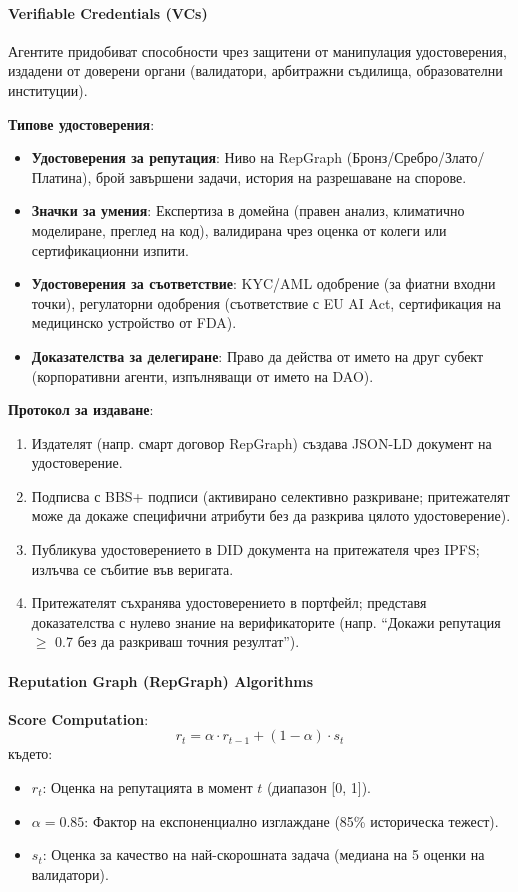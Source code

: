 \documentclass[11pt]{article}
\begin{document}
\paragraph{Verifiable Credentials (VCs)}
Агентите придобиват способности чрез защитени от манипулация удостоверения, издадени от доверени органи (валидатори, арбитражни съдилища, образователни институции).

\textbf{Типове удостоверения}:
\begin{itemize}[noitemsep]
  \item \textbf{Удостоверения за репутация}: Ниво на RepGraph (Бронз/Сребро/Злато/Платина), брой завършени задачи, история на разрешаване на спорове.
  \item \textbf{Значки за умения}: Експертиза в домейна (правен анализ, климатично моделиране, преглед на код), валидирана чрез оценка от колеги или сертификационни изпити.
  \item \textbf{Удостоверения за съответствие}: KYC/AML одобрение (за фиатни входни точки), регулаторни одобрения (съответствие с EU AI Act, сертификация на медицинско устройство от FDA).
  \item \textbf{Доказателства за делегиране}: Право да действа от името на друг субект (корпоративни агенти, изпълняващи от името на DAO).
\end{itemize}

\textbf{Протокол за издаване}:
\begin{enumerate}[noitemsep]
  \item Издателят (напр. смарт договор RepGraph) създава JSON-LD документ на удостоверение.
  \item Подписва с BBS+ подписи (активирано селективно разкриване; притежателят може да докаже специфични атрибути без да разкрива цялото удостоверение).
  \item Публикува удостоверението в DID документа на притежателя чрез IPFS; излъчва се събитие във веригата.
  \item Притежателят съхранява удостоверението в портфейл; представя доказателства с нулево знание на верификаторите (напр. ``Докажи репутация $\geq$ 0.7 без да разкриваш точния резултат'').
\end{enumerate}

\paragraph{Reputation Graph (RepGraph) Algorithms}

\textbf{Score Computation}:
\begin{equation}
r_t = \alpha \cdot r_{t-1} + (1 - \alpha) \cdot s_t
\end{equation}
където:
\begin{itemize}[noitemsep]
  \item $r_t$: Оценка на репутацията в момент $t$ (диапазон [0, 1]).
  \item $\alpha = 0.85$: Фактор на експоненциално изглаждане (85\% историческа тежест).
  \item $s_t$: Оценка за качество на най-скорошната задача (медиана на 5 оценки на валидатори).
\end{itemize}
\end{document}
